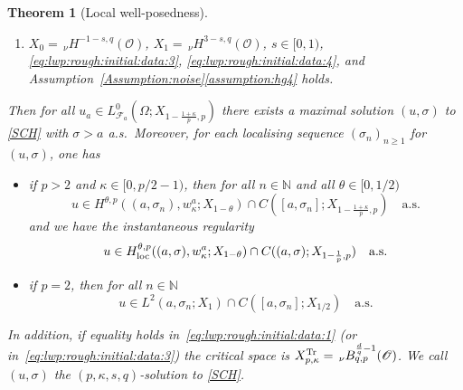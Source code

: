 \documentclass[reqno]{amsart}
\newtheorem{theorem}[Satz]{Theorem}
\newcommand{\N}{\mathbb{N}}
\newcommand{\F}{\mathscr{F}}
\newcommand{\sO}{\mathscr{O}}
\newcommand{\1}{\mathbf{1}}
\newcommand{\loc}{\textup{loc}}
\newcommand{\nH}{\ensuremath{\,_\nu H}}
\newcommand{\bpsn}[1]{\ensuremath{\nH^{#1}(\sO)}}
\begin{document}
\begin{theorem}[Local well-posedness]
\begin{enumerate}
            \item\label{it:lwp:rough:initial:data:4}
             $X_0=\bpsn{-1-s,q}$, $X_1=\bpsn{3-s,q}$,
            $s\in[0,1)$, \eqref{eq:lwp:rough:initial:data:3}, \eqref{eq:lwp:rough:initial:data:4}, and Assumption~\ref{Assumption:noise}\ref{assumption:hg4}
            holds.
		\end{enumerate}
		Then for all $u_a\in L^0_{\F_a}(\Omega; X_{1-\frac{1+\kappa}{p},p})$ there exists a maximal solution $(u,\sigma)$ to \eqref{SCH} with $\sigma>a$ a.s.\ Moreover, for each localising sequence $(\sigma_n)_{n\ge 1}$ for $(u,\sigma)$, one has 
		\begin{itemize}
			\item if $p>2$ and $\kappa\in [0,p/2-1)$, then for all $n\in \N$ and all $\theta\in [0,1/2)$
				\[u\in H^{\theta,p}((a,\sigma_n),w^a_\kappa; X_{1-\theta})\cap C([a,\sigma_n];X_{1-\frac{1+\kappa}{p},p})\quad \text{a.s.}\]
			and we have the instantaneous regularity
			\[u\in H_{\loc}^{\theta,p}((a,\sigma), w^a_\kappa; X_{1-\theta})\cap C((a,\sigma); X_{1-\frac{1}{p},p})\quad \text{a.s.}\]
			\item if $p=2$, then for all $n\in \N$
			\[u\in L^2(a,\sigma_n;X_1)\cap C([a,\sigma_n];X_{1/2})\quad \text{a.s.}\]
		\end{itemize}
		In addition, if equality holds in~\eqref{eq:lwp:rough:initial:data:1} (or in~\eqref{eq:lwp:rough:initial:data:3}) the critical space is $ X_{p,\kappa}^{\textup{Tr}}= \,_\nu B_{q,p}^{\frac{d}{q}-1}(\sO)$. We call $(u,\sigma)$ the $(p,\kappa,s,q)$-solution to \eqref{SCH}.
	\end{theorem}
\end{document}
